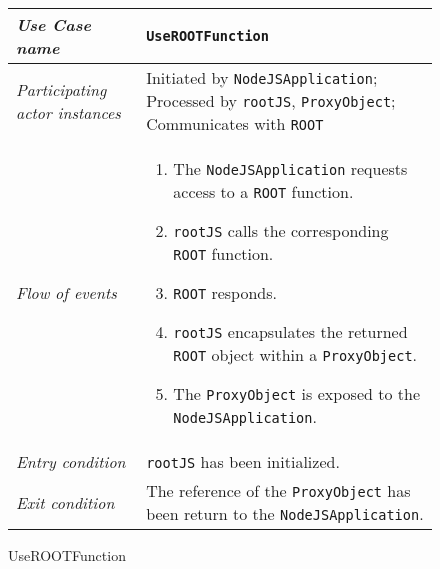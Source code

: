 \begin{figure}[htb]
	\centering
	\begin{longtable}{p{3cm} @{\hskip 1cm} p{12cm}}
		\hline
		
		\textit{Use Case name} & \texttt{UseROOTFunction}\\
		\hline
		
		\textit{Participating actor instances} & Initiated by \texttt{NodeJSApplication};
                Processed by \texttt{rootJS}, \texttt{ProxyObject};
                Communicates with \texttt{ROOT}\\
		\hline
		
		\textit{Flow of events} &
			\begin{enumerate}
				\item The \texttt{NodeJSApplication} requests access to a \texttt{ROOT} function.
				
				\item \texttt{rootJS} calls the corresponding \texttt{ROOT} function.
				
				\item \texttt{ROOT} responds.
				
				\item \texttt{rootJS} encapsulates the returned \texttt{ROOT} object within a \texttt{ProxyObject}.
				
				\item The \texttt{ProxyObject} is exposed to the \texttt{NodeJSApplication}.
			\end{enumerate}
			\\
		\hline
		
		\textit{Entry condition} & \texttt{rootJS} has been initialized.\\
		\hline
		
		\textit{Exit condition} & The reference of the \texttt{ProxyObject} has been return to the \texttt{NodeJSApplication}.\\
        \hline
	\end{longtable}
	
	\caption{UseROOTFunction}
\end{figure}

